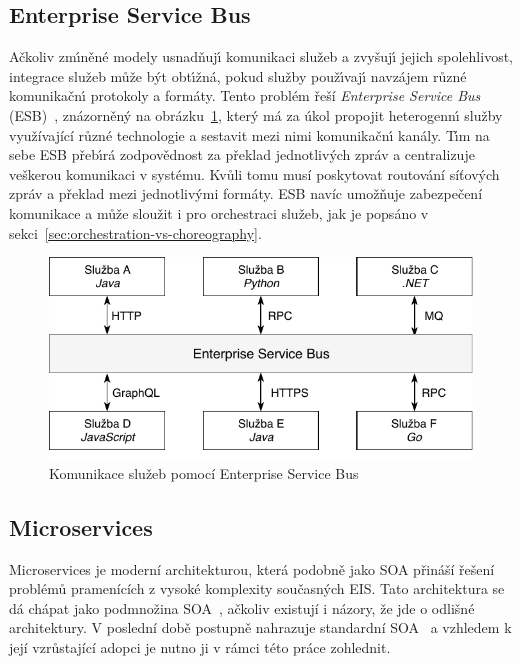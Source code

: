 \subsection{Enterprise Service Bus}

Ačkoliv zm\'{\i}něné modely usnadňuj\'{\i} komunikaci služeb a zvyšuj\'{\i} jejich
spolehlivost, integrace služeb může b\'yt obt\'{\i}žná, pokud služby použ\'{\i}vaj\'{\i}
navzájem různé komunikačn\'{\i} protokoly a formáty. Tento problém řeší \textit{Enterprise Service
Bus} (\gls{ESB})~\cite{chappell2004enterprise}, znázorněn\'y na obrázku~\ref{fig:enterprise-service-bus},
kter\'y má za úkol propojit heterogenn\'{\i} služby využívající různé technologie a sestavit mezi nimi
komunikačn\'{\i} kanály. T\'{\i}m na sebe \gls{ESB} přeb\'{\i}rá zodpovědnost za překlad jednotliv\'ych zpráv
a centralizuje veškerou komunikaci v systému. Kvůli tomu musí poskytovat routování síťových zpráv a překlad mezi
jednotlivými formáty. \gls{ESB} navíc umožňuje zabezpečení komunikace a může sloužit i pro orchestraci služeb,
jak je popsáno v sekci~\ref{sec:orchestration-vs-choreography}.

\begin{figure}
    \centering
    \includegraphics[keepaspectratio=true, width=0.65\linewidth]{figures/enterprise-service-bus.pdf}
    \caption{Komunikace služeb pomocí Enterprise Service Bus}
    \label{fig:enterprise-service-bus}
\end{figure}

\subsection{Microservices}\label{sec:microservices}

Microservices je moderní architekturou, která podobně jako \gls{SOA} přináší řešení
problémů pramenících z vysoké komplexity současných \gls{EIS}. Tato architektura se dá
chápat jako podmnožina \gls{SOA}~\cite{cerny2017disambiguation, richards2015microservices},
ačkoliv existují i názory, že jde o odlišné architektury. V poslední době postupně nahrazuje standardní
\gls{SOA}~\cite{lewis2014microservices, xiao2016reflections} a vzhledem k její vzrůstající
adopci je nutno ji v rámci této práce zohlednit.

